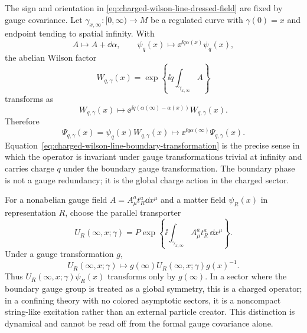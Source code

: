 The sign and orientation in
\eqref{eq:charged-wilson-line-dressed-field} are fixed by gauge covariance.
Let \(\gamma_{x,\infty}:[0,\infty)\to M\) be a regulated curve with
\(\gamma(0)=x\) and endpoint tending to spatial infinity.  With
\[
  A\mapsto A+\dd\alpha,\qquad
  \psi_q(x)\mapsto \ee^{\ii q\alpha(x)}\psi_q(x),
\]
the abelian Wilson factor
\[
  W_{q,\gamma}(x)
  =
  \exp\!\left\{\ii q\int_{\gamma_{x,\infty}} A\right\}
\]
transforms as
\[
  W_{q,\gamma}(x)
  \longmapsto
  \ee^{\ii q(\alpha(\infty)-\alpha(x))}W_{q,\gamma}(x).
\]
Therefore
\begin{equation}
  \Psi_{q,\gamma}(x)=\psi_q(x)W_{q,\gamma}(x)
  \longmapsto
  \ee^{\ii q\alpha(\infty)}\Psi_{q,\gamma}(x).
  \label{eq:charged-wilson-line-boundary-transformation}
\end{equation}
Equation~\eqref{eq:charged-wilson-line-boundary-transformation} is the
precise sense in which the operator is invariant under gauge transformations
trivial at infinity and carries charge \(q\) under the boundary gauge
transformation.  The boundary phase is not a gauge redundancy; it is the
global charge action in the charged sector.

For a nonabelian gauge field \(A=A_\mu^a t^a_R\dd x^\mu\) and a matter field
\(\psi_R(x)\) in representation \(R\), choose the parallel transporter
\[
  U_R(\infty,x;\gamma)
  =
  P\exp\!\left\{\ii\int_{\gamma_{x,\infty}} A_\mu^a t^a_R\,\dd x^\mu\right\}.
\]
Under a gauge transformation \(g\),
\[
  U_R(\infty,x;\gamma)
  \longmapsto
  g(\infty)U_R(\infty,x;\gamma)g(x)^{-1}.
\]
Thus \(U_R(\infty,x;\gamma)\psi_R(x)\) transforms only by \(g(\infty)\).  In
a sector where the boundary gauge group is treated as a global symmetry, this
is a charged operator; in a confining theory with no colored asymptotic
sectors, it is a noncompact string-like excitation rather than an external
particle creator.  This distinction is dynamical and cannot be read off from
the formal gauge covariance alone.

